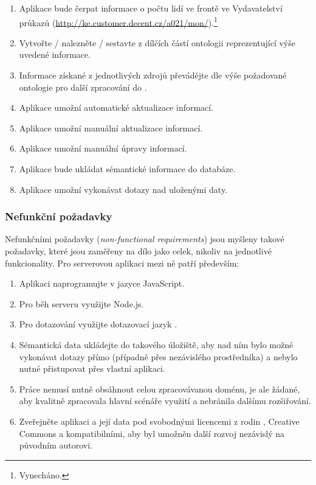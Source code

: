 \begin{enumerate}
 \item Aplikace bude čerpat informace o počtu lidí ve frontě ve Vydavatelství průkazů (\url{http://ke.customer.decent.cz/a021/mon/}).\footnote{Vynecháno.}
 \item Vytvořte / nalezněte / sestavte z dílčích částí ontologii reprezentující výše uvedené informace.
 \item Informace získané z jednotlivých zdrojů převádějte dle výše požadované ontologie pro další zpracování do .
 \item Aplikace umožní automatické aktualizace informací.
 \item Aplikace umožní manuální aktualizace informací.
 \item Aplikace umožní manuální úpravy informací.
 \item Aplikace bude ukládat sémantické informace do databáze.
 \item Aplikace umožní vykonávat dotazy nad uloženými daty.
\end{enumerate}

\subsubsection{Nefunkční požadavky}
Nefunkčními požadavky (\textit{non-functional requirements}) jsou myšleny takové požadavky, které jsou zaměřeny na dílo jako celek, nikoliv na jednotlivé funkcionality. Pro serverovou aplikaci mezi ně patří především:

\begin{enumerate}
 \item Aplikaci naprogramujte v jazyce JavaScript.
 \item Pro běh serveru využijte Node.js.
 \item Pro dotazování využijte dotazovací jazyk .
 \item Sémantická data ukládejte do takového úložiště, aby nad ním bylo možné vykonávat dotazy přímo (případně přes nezávislého prostředníka) a nebylo nutné přistupovat přes vlastní aplikaci.
 \item Práce nemusí nutně obsáhnout celou zpracovávanou doménu, je ale žádané, aby kvalitně zpracovala hlavní scénáře využití a nebránila dalšímu rozšiřování.
 \item Zveřejněte aplikaci a její data pod svobodnými licencemi z rodin , Creative Commons a kompatibilními, aby byl umožněn další rozvoj nezávislý na původním autorovi.
\end{enumerate}


